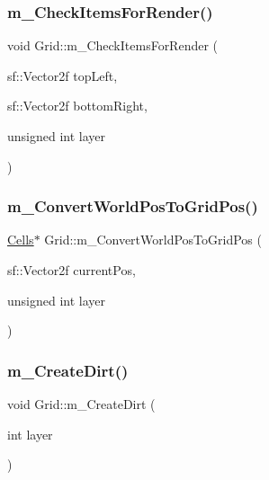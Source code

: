 \subsubsection{\texorpdfstring{m\+\_\+\+Check\+Items\+For\+Render()}{m\_CheckItemsForRender()}}
{\footnotesize\ttfamily void Grid\+::m\+\_\+\+Check\+Items\+For\+Render (\begin{DoxyParamCaption}\item[{sf\+::\+Vector2f}]{top\+Left,  }\item[{sf\+::\+Vector2f}]{bottom\+Right,  }\item[{unsigned int}]{layer }\end{DoxyParamCaption})}

\mbox{\label{class_grid_ac1e06043497ba5c2b5c7e83d910f90a0}} 
\subsubsection{\texorpdfstring{m\+\_\+\+Convert\+World\+Pos\+To\+Grid\+Pos()}{m\_ConvertWorldPosToGridPos()}}
{\footnotesize\ttfamily \mbox{\hyperlink{class_cells}{Cells}}$\ast$ Grid\+::m\+\_\+\+Convert\+World\+Pos\+To\+Grid\+Pos (\begin{DoxyParamCaption}\item[{sf\+::\+Vector2f}]{current\+Pos,  }\item[{unsigned int}]{layer }\end{DoxyParamCaption})}

\mbox{\label{class_grid_aa0ee683a771225bfdbe07ecd6c4341fb}} 
\subsubsection{\texorpdfstring{m\+\_\+\+Create\+Dirt()}{m\_CreateDirt()}}
{\footnotesize\ttfamily void Grid\+::m\+\_\+\+Create\+Dirt (\begin{DoxyParamCaption}\item[{int}]{layer }\end{DoxyParamCaption})}

\mbox{\label{class_grid_a0868e8a5ebf55a8746637300bc7aa68b}} 
